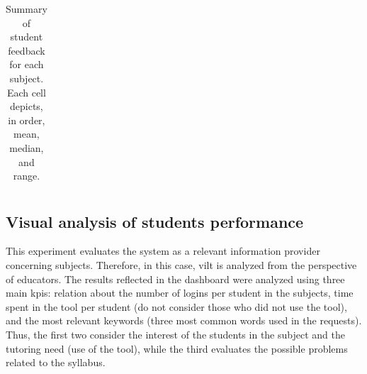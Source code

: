 \documentclass[pdflatex,sn-mathphys-num]{sn-jnl}%
\begin{document}
\begin{table}[t!]
\begin{tabular}{|l|l|l|l|}
	\end{tabular}
	\caption{Summary of student feedback for each subject. Each cell depicts, in order, mean, median, and range.}
	\label{tab:feedback}
\end{table}

\subsection{Visual analysis of students performance}
\label{sec:visual}
This experiment evaluates the system as a relevant information provider concerning subjects. Therefore, in this case, \ac{vilt} is analyzed from the perspective of educators. The results reflected in the dashboard were analyzed using three main \acp{kpi}: relation about the number of logins per student in the subjects, time spent in the tool per student (do not consider those who did not use the tool), and the most relevant keywords (three most common words used in the requests). Thus, the first two consider the interest of the students in the subject and the tutoring need (use of the tool), while the third evaluates the possible problems related to the syllabus.
\end{document}
